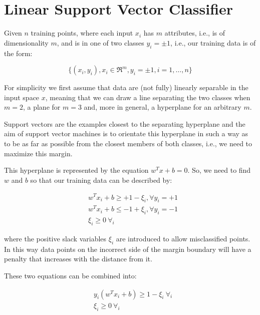 \section{Linear Support Vector Classifier} \label{section:svc}

Given $n$ training points, where each input $x_i$ has $m$ attributes, i.e., is of dimensionality $m$, and is in one of two classes $y_i=\pm1$, i.e., our training data is of the form:

\begin{equation}
	\{(x_i,y_i), x_i\in\Re^m, y_i=\pm1, i=1, \dots, n\} \label{eq:svc_data}
\end{equation}

For simplicity we first assume that data are (not fully) linearly separable in the input space $x$, meaning that we can draw a line separating the two classes when $m=2$, a plane for $m=3$ and, more in general, a hyperplane for an arbitrary $m$.

Support vectors are the examples closest to the separating hyperplane and the aim of support vector machines is to orientate this hyperplane in such a way as to be as far as possible from the closest members of both classes, i.e., we need to maximize this margin.

This hyperplane is represented by the equation $w^T x + b=0$. So, we need to find $w$ and $b$ so that our training data can be described by:

\begin{equation} \label{eq:svc_consts}
	\begin{aligned}
		& w^T x_i + b \geq +1 - \xi_i, \forall y_i=+1 \\
    	& w^T x_i + b \leq -1 + \xi_i, \forall y_i=-1 \\
    	& \xi_i \geq 0 \ \forall_i
	\end{aligned}
\end{equation}

where the positive slack variables $\xi_i$ are introduced to allow misclassified points. In this way data points on the incorrect side of the margin boundary will have a penalty that increases with the distance from it.

These two equations can be combined into:

\begin{equation} \label{eq:svc_const}
	\begin{aligned}
    	& y_i (w^T x_i + b) \geq 1 - \xi_i \ \forall_i \\
    	& \xi_i\geq 0 \ \forall_i
    \end{aligned}
\end{equation}

